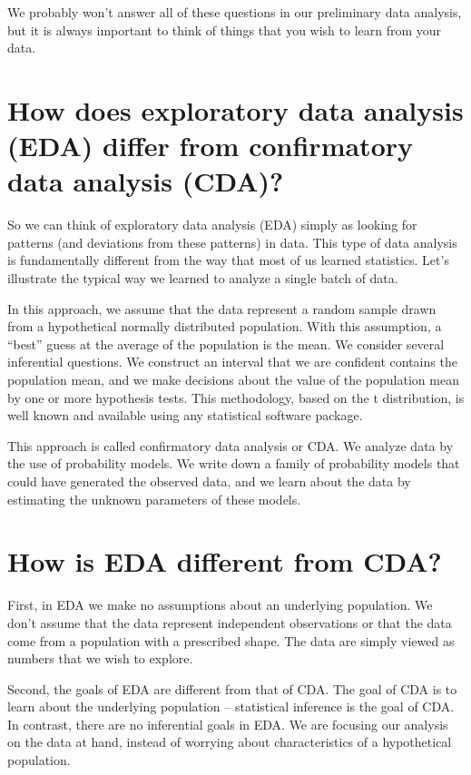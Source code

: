 \documentclass[
]{book}
\begin{document}
We probably won't answer all of these questions in our preliminary data analysis, but it is always important to think of things that you wish to learn from your data.

\hypertarget{how-does-exploratory-data-analysis-eda-differ-from-confirmatory-data-analysis-cda}{%
\section{How does exploratory data analysis (EDA) differ from confirmatory data analysis (CDA)?}\label{how-does-exploratory-data-analysis-eda-differ-from-confirmatory-data-analysis-cda}}

So we can think of exploratory data analysis (EDA) simply as looking for patterns (and deviations from these patterns) in data. This type of data analysis is fundamentally different from the way that most of us learned statistics. Let's illustrate the typical way we learned to analyze a single batch of data.

In this approach, we assume that the data represent a random sample drawn from a hypothetical normally distributed population. With this assumption, a ``best'' guess at the average of the population is the mean. We consider several inferential questions. We construct an interval that we are confident contains the population mean, and we make decisions about the value of the population mean by one or more hypothesis tests. This methodology, based on the t distribution, is well known and available using any statistical software package.

This approach is called confirmatory data analysis or CDA. We analyze data by the use of probability models. We write down a family of probability models that could have generated the observed data, and we learn about the data by estimating the unknown parameters of these models.

\hypertarget{how-is-eda-different-from-cda}{%
\section{How is EDA different from CDA?}\label{how-is-eda-different-from-cda}}

First, in EDA we make no assumptions about an underlying population. We don't assume that the data represent independent observations or that the data come from a population with a prescribed shape. The data are simply viewed as numbers that we wish to explore.

Second, the goals of EDA are different from that of CDA. The goal of CDA is to learn about the underlying population -- statistical inference is the goal of CDA. In contrast, there are no inferential goals in EDA. We are focusing our analysis on the data at hand, instead of worrying about characteristics of a hypothetical population.
\end{document}
